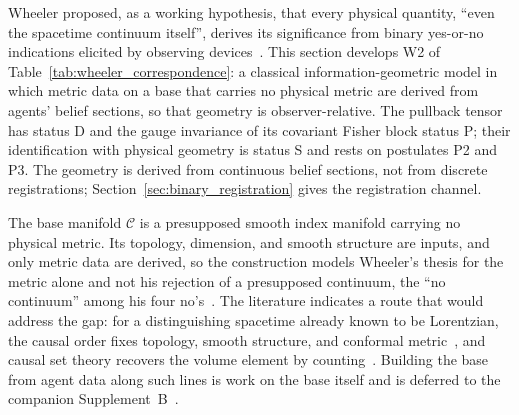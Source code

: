 \documentclass[11pt]{article}
\begin{document}
Wheeler proposed, as a working hypothesis, that every physical quantity, ``even the spacetime continuum itself'', derives its significance from binary yes-or-no indications elicited by observing devices~\cite{Wheeler1990}. This section develops W2 of Table~\ref{tab:wheeler_correspondence}: a classical information-geometric model in which metric data on a base that carries no physical metric are derived from agents' belief sections, so that geometry is observer-relative. The pullback tensor has status D and the gauge invariance of its covariant Fisher block status P; their identification with physical geometry is status S and rests on postulates P2 and P3. The geometry is derived from continuous belief sections, not from discrete registrations; Section~\ref{sec:binary_registration} gives the registration channel.

The base manifold $\mathcal{C}$ is a presupposed smooth index manifold carrying no physical metric. Its topology, dimension, and smooth structure are inputs, and only metric data are derived, so the construction models Wheeler's thesis for the metric alone and not his rejection of a presupposed continuum, the ``no continuum'' among his four no's~\cite{Wheeler1990}. The literature indicates a route that would address the gap: for a distinguishing spacetime already known to be Lorentzian, the causal order fixes topology, smooth structure, and conformal metric~\cite{HawkingKingMcCarthy1976, Malament1977}, and causal set theory recovers the volume element by counting~\cite{BombelliLeeMeyerSorkin1987}. Building the base from agent data along such lines is work on the base itself and is deferred to the companion Supplement~B~\cite{DennisGaugeVFESuppB2026}.
\end{document}
